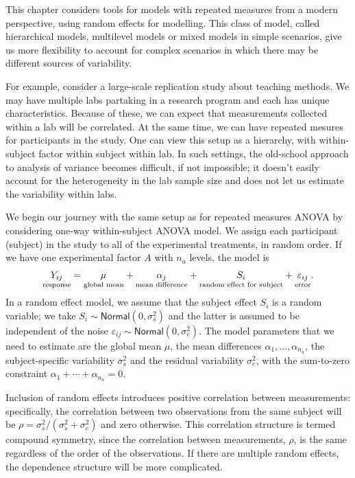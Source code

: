 \documentclass[
  11pt,
  letterpaper,
]{scrbook}
\theoremstyle{definition}
\theoremstyle{remark}
\begin{document}
This chapter considers tools for models with repeated measures from a
modern perspective, using random effects for modelling. This class of
model, called hierarchical models, multilevel models or mixed models in
simple scenarios, give us more flexibility to account for complex
scenarios in which there may be different sources of variability.

For example, consider a large-scale replication study about teaching
methods. We may have multiple labs partaking in a research program and
each has unique characteristics. Because of these, we can expect that
measurements collected within a lab will be correlated. At the same
time, we can have repeated mesures for participants in the study. One
can view this setup as a hierarchy, with within-subject factor within
subject within lab. In such settings, the old-school approach to
analysis of variance becomes difficult, if not impossible; it doesn't
easily account for the heterogeneity in the lab sample size and does not
let us estimate the variability within labs.

We begin our journey with the same setup as for repeated measures ANOVA
by considering one-way within-subject ANOVA model. We assign each
participant (subject) in the study to all of the experimental
treatments, in random order. If we have one experimental factor \(A\)
with \(n_a\) levels, the model is
\begin{align*}\underset{\text{response}\vphantom{l}}{Y_{ij}} = \underset{\text{global mean}}{\mu_{\vphantom{j}}} + \underset{\text{mean difference}}{\alpha_j} + \underset{\text{random effect for subject}}{S_{i\vphantom{j}}} + \underset{\text{error}\vphantom{l}}{\varepsilon_{ij}}.
\end{align*} In a random effect model, we assume that the subject effect
\(S_i\) is a random variable; we take
\(S_i \sim \mathsf{Normal}(0, \sigma^2_s)\) and the latter is assumed to
be independent of the noise
\(\varepsilon_{ij} \sim \mathsf{Normal}(0, \sigma^2_e)\). The model
parameters that we need to estimate are the global mean \(\mu\), the
mean differences \(\alpha_1, \ldots, \alpha_{n_a}\), the
subject-specific variability \(\sigma^2_s\) and the residual variability
\(\sigma^2_e\), with the sum-to-zero constraint
\(\alpha_1 + \cdots + \alpha_{n_a}=0\).

Inclusion of random effects introduces positive correlation between
measurements: specifically, the correlation between two observations
from the same subject will be
\(\rho=\sigma^2_s/(\sigma^2_s+\sigma^2_e)\) and zero otherwise. This
correlation structure is termed compound symmetry, since the correlation
between measurements, \(\rho\), is the same regardless of the order of
the observations. If there are multiple random effects, the dependence
structure will be more complicated.
\end{document}

